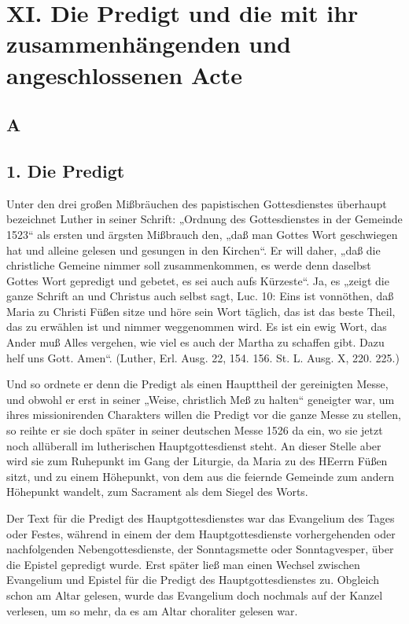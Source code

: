 
\chapter[XI. Die Predigt und die Acte]{XI. Die Predigt und die mit ihr zusammenhängenden und angeschlossenen Acte}


\section{A}

\section{1. Die Predigt}

Unter den drei großen Mißbräuchen des papistischen Gottesdienstes überhaupt bezeichnet Luther in seiner Schrift: „Ordnung des Gottesdienstes in der Gemeinde 1523“ als ersten und ärgsten Mißbrauch den, „daß man Gottes Wort geschwiegen hat und alleine gelesen und gesungen in den Kirchen“. Er will daher, „daß die christliche Gemeine nimmer soll zusammenkommen, es werde denn daselbst Gottes Wort gepredigt und gebetet, es sei auch aufs Kürzeste“. Ja, es „zeigt die ganze Schrift an und Christus auch selbst sagt, Luc. 10: Eins ist vonnöthen, daß Maria zu Christi Füßen sitze und höre sein Wort täglich, das ist das beste Theil, das zu erwählen ist und nimmer weggenommen wird. Es ist ein ewig Wort, das Ander muß Alles vergehen, wie viel es auch der Martha zu schaffen gibt. Dazu helf uns Gott. Amen“. (Luther, Erl. Ausg. 22, 154. 156. St. L. Ausg. X, 220. 225.)

Und so ordnete er denn die Predigt als einen Haupttheil der gereinigten Messe, und obwohl er erst in seiner „Weise, christlich Meß zu halten“ geneigter war, um ihres missionirenden Charakters willen die Predigt vor die ganze Messe zu stellen, so reihte er sie doch später in seiner deutschen Messe 1526 da
ein, wo sie jetzt noch allüberall im lutherischen Hauptgottesdienst steht. An dieser Stelle aber wird sie zum Ruhepunkt im Gang der Liturgie, da Maria zu des HEerrn Füßen sitzt, und zu einem Höhepunkt, von dem aus die feiernde Gemeinde zum andern Höhepunkt wandelt, zum Sacrament als dem Siegel des Worts.

Der Text für die Predigt des Hauptgottesdienstes war das Evangelium des Tages oder Festes, während in einem der dem Hauptgottesdienste vorhergehenden oder nachfolgenden Nebengottesdienste, der Sonntagsmette oder Sonntagvesper, über die Epistel gepredigt wurde. Erst später ließ man einen Wechsel zwischen Evangelium und Epistel für die Predigt des Hauptgottesdienstes zu. Obgleich schon am Altar gelesen, wurde das Evangelium doch nochmals auf der Kanzel verlesen, um so mehr, da es am Altar choraliter gelesen war.

